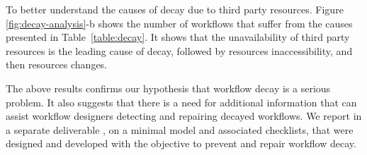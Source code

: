 To better understand the causes of decay due to third party resources. Figure \ref{fig:decay-analysis}-b shows the number of workflows that suffer from the causes presented in Table~\ref{table:decay}. It shows that the unavailability of third party resources is the leading cause of decay, followed by resources inaccessibility, and then resources changes. 

The above results confirms our hypothesis that workflow decay is a serious problem. It also suggests that there is a need for additional information that can assist workflow designers detecting and repairing decayed workflows. We report in a separate deliverable \cite{deliverable-containing-checklist}, on a minimal model and associated checklists, that were designed and developed with the objective to prevent and repair workflow decay.
